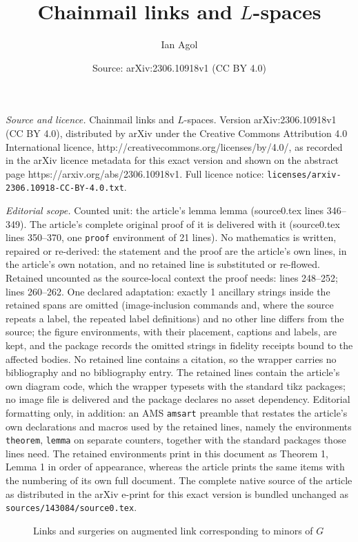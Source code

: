 \documentclass[10pt,a4paper]{amsart}
\title{Chainmail links and $L$-spaces}
\author{Ian Agol}
\date{Source: arXiv:2306.10918v1 (CC BY 4.0)}
\begin{document}
\maketitle

\noindent\emph{Source and licence.} Chainmail links and $L$-spaces. Version arXiv:2306.10918v1 (CC BY 4.0), distributed by arXiv under the Creative Commons Attribution 4.0 International licence, http://creativecommons.org/licenses/by/4.0/, as recorded in the arXiv licence metadata for this exact version and shown on the abstract page https://arxiv.org/abs/2306.10918v1. Full licence notice: \texttt{licenses/arxiv-2306.10918-CC-BY-4.0.txt}.\par\smallskip

\noindent\textit{Editorial scope.} Counted unit: the article's lemma lemma (source0.tex lines 346--349). The article's complete original proof of it is delivered with it (source0.tex lines 350--370, one \texttt{proof} environment of 21 lines). No mathematics is written, repaired or re-derived: the statement and the proof are the article's own lines, in the article's own notation, and no retained line is substituted or re-flowed.  Retained uncounted as the source-local context the proof needs: lines 248--252; lines 260--262.  One declared adaptation: exactly 1 ancillary strings inside the retained spans are omitted (image-inclusion commands and, where the source repeats a label, the repeated label definitions) and no other line differs from the source; the figure environments, with their placement, captions and labels, are kept, and the package records the omitted strings in fidelity receipts bound to the affected bodies.  No retained line contains a citation, so the wrapper carries no bibliography and no bibliography entry.  The retained lines contain the article's own diagram code, which the wrapper typesets with the standard tikz packages; no image file is delivered and the package declares no asset dependency.  Editorial formatting only, in addition: an AMS \texttt{amsart} preamble that restates the article's own declarations and macros used by the retained lines, namely the environments \texttt{theorem}, \texttt{lemma} on separate counters, together with the standard packages those lines need.  The retained environments print in this document as Theorem 1, Lemma 1 in order of appearance, whereas the article prints the same items with the numbering of its own full document.  The complete native source of the article as distributed in the arXiv e-print for this exact version is bundled unchanged as \texttt{sources/143084/source0.tex}.
\begin{figure}[htb]

\caption{Links and surgeries on augmented link corresponding to minors of $G$} \label{crossing_loop}

\end{figure}
\end{document}
